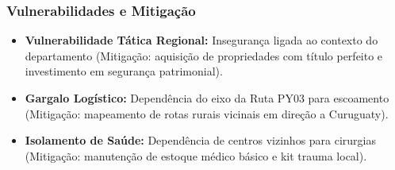 \subsubsection{Vulnerabilidades e
Mitigação}

\begin{itemize}
\tightlist
\item
  \textbf{Vulnerabilidade Tática Regional:} Insegurança ligada ao
  contexto do departamento (Mitigação: aquisição de propriedades com
  título perfeito e investimento em segurança patrimonial).
\item
  \textbf{Gargalo Logístico:} Dependência do eixo da Ruta PY03 para
  escoamento (Mitigação: mapeamento de rotas rurais vicinais em direção
  a Curuguaty).
\item
  \textbf{Isolamento de Saúde:} Dependência de centros vizinhos para
  cirurgias (Mitigação: manutenção de estoque médico básico e kit trauma
  local).
\end{itemize}

